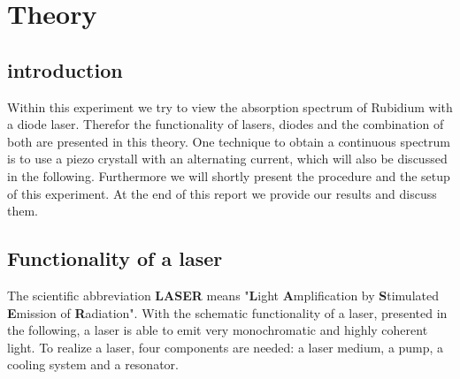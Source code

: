 \section{Theory}
\label{sec:theory}

\subsection{introduction}

Within this experiment we try to view the absorption spectrum of Rubidium with a diode laser.
Therefor the functionality of lasers, diodes and the combination of both are presented in this theory.
One technique to obtain a continuous spectrum is to use a piezo crystall with an alternating current, which
will also be discussed in the following.
Furthermore we will shortly present the procedure and the setup of this experiment.
At the end of this report we provide our results and discuss them.

\subsection{Functionality of a laser}
\label{sec:laser}

The scientific abbreviation \textbf{LASER} means "\textbf{L}ight \textbf{A}mplification by \textbf{S}timulated \textbf{E}mission of \textbf{R}adiation".
With the schematic functionality of a laser, presented in the following, a laser is able to emit
very monochromatic and highly coherent light. To realize a laser, four components are needed: a laser medium, a pump, a cooling system and a resonator.

